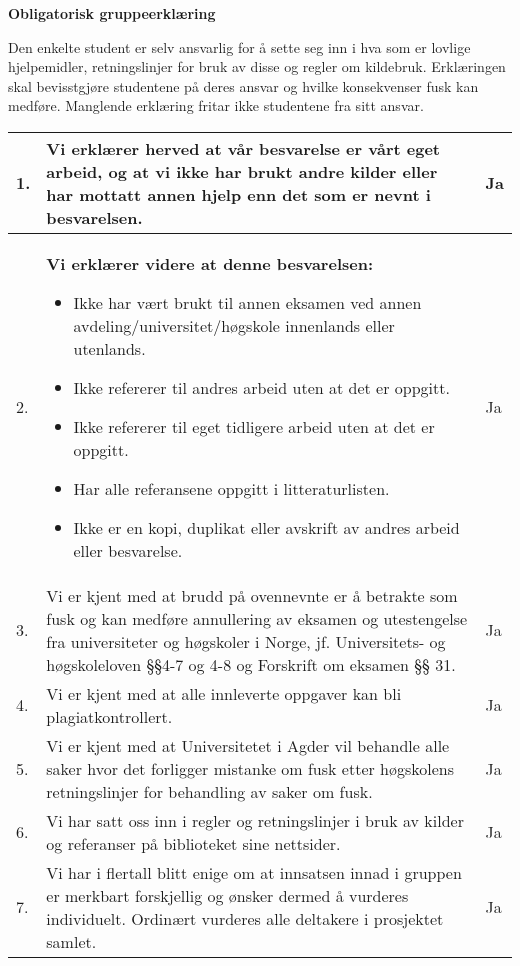

\large{\bf{Obligatorisk gruppeerklæring}} \\

{\small {}
Den enkelte student er selv ansvarlig for å sette seg inn i hva som er lovlige hjelpemidler, retningslinjer for bruk av disse og regler om kildebruk. Erklæringen skal bevisstgjøre studentene på deres ansvar og hvilke konsekvenser fusk kan medføre. Manglende erklæring fritar ikke studentene fra sitt ansvar.\\

\begin{center}
\begin{tabular}{ |p{1cm}|p{11.5cm}|p{1cm}|}
 \hline  
 
 1. & Vi erklærer herved at vår besvarelse er vårt eget arbeid, og at vi ikke har brukt andre kilder eller har mottatt annen hjelp enn det som er nevnt i besvarelsen. & Ja \\
 \hline
 2. & \textbf{Vi erklærer videre at denne besvarelsen:}
 \begin{itemize}
    \item Ikke har vært brukt til annen eksamen ved annen avdeling/universitet/høgskole innenlands eller utenlands.
    \item Ikke refererer til andres arbeid uten at det er oppgitt.
    \item Ikke refererer til eget tidligere arbeid uten at det er oppgitt.
    \item Har alle referansene oppgitt i litteraturlisten.
    \item Ikke er en kopi, duplikat eller avskrift av andres arbeid eller besvarelse.
 \end{itemize}& Ja \\
 \hline
 3. & Vi er kjent med at brudd på ovennevnte er å betrakte som fusk og kan medføre annullering av eksamen og utestengelse fra universiteter og høgskoler i Norge, jf. Universitets- og høgskoleloven §§4-7 og 4-8 og Forskrift om eksamen §§ 31.
 & Ja \\
 \hline
 4. & Vi er kjent med at alle innleverte oppgaver kan bli plagiatkontrollert.
 & Ja \\
 \hline
 5. & Vi er kjent med at Universitetet i Agder vil behandle alle saker hvor det forligger mistanke om fusk etter høgskolens retningslinjer for behandling av saker om fusk.
 & Ja \\
 \hline
 6. & Vi har satt oss inn i regler og retningslinjer i bruk av kilder og referanser på biblioteket sine nettsider.
 & Ja \\
 \hline
 7. & Vi har i flertall blitt enige om at innsatsen innad i gruppen er merkbart forskjellig og ønsker dermed å vurderes individuelt.
Ordinært vurderes alle deltakere i prosjektet samlet.
 & Ja \\
 \hline
\end{tabular}
\end{center}}

